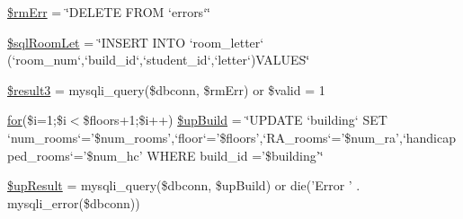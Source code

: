 \begin{DoxyCompactItemize}
\item 
\hyperlink{roomsVal_8php_aa1d0fd452ef88c3f247e457ae5d04157}{\$rm\-Err} = \char`\"{}\-D\-E\-L\-E\-T\-E \-F\-R\-O\-M `errors`\char`\"{}
\item 
\hyperlink{roomsVal_8php_afcbf90f700af2e9cb340e31593985d6e}{\$sql\-Room\-Let} = \char`\"{}\-I\-N\-S\-E\-R\-T \-I\-N\-T\-O `room\-\_\-letter` (`room\-\_\-num`,`build\-\_\-id`,`student\-\_\-id`,`letter`)\-V\-A\-L\-U\-E\-S\char`\"{}
\item 
\hyperlink{roomsVal_8php_a3bed351c02cbc07bce580e0044c8d37d}{\$result3} = mysqli\-\_\-query(\$dbconn, \$rm\-Err) or \$valid = 1
\item 
\hyperlink{sendMail_8php_a97c5d50455f68774b384f988b990d00f}{for}(\$i=1;\$i$<$\$floors+1;\$i++) \hyperlink{roomsVal_8php_af17c301fdf57702d6eafe21020b9b075}{\$up\-Build} = \char`\"{}\-U\-P\-D\-A\-T\-E `building` \-S\-E\-T `num\-\_\-rooms`='\$num\-\_\-rooms',`floor`='\$floors',`\-R\-A\-\_\-rooms`='\$num\-\_\-ra',`handicapped\-\_\-rooms`='\$num\-\_\-hc' \-W\-H\-E\-R\-E build\-\_\-id ='\$building'\char`\"{}
\item 
\hyperlink{roomsVal_8php_a1b79716c00a22cc3e20b13c14978f455}{\$up\-Result} = mysqli\-\_\-query(\$dbconn, \$up\-Build) or die('\-Error ' . mysqli\-\_\-error(\$dbconn))
\end{DoxyCompactItemize}


